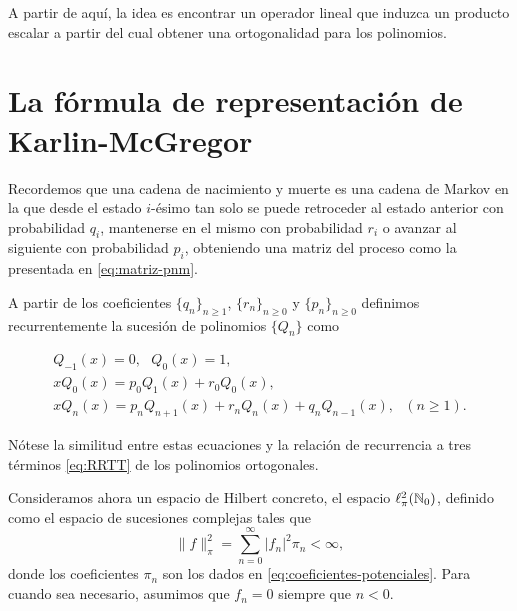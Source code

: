     A partir de aquí, la idea es encontrar un operador lineal que induzca un producto escalar a partir del cual obtener una ortogonalidad para los polinomios.

    \section{La fórmula de representación de Karlin-McGregor}


    Recordemos que una cadena de nacimiento y muerte es una cadena de Markov en la que desde el estado $i$-ésimo tan solo se puede retroceder al estado anterior con probabilidad $q_i$, mantenerse en el mismo con probabilidad $r_i$ o avanzar al siguiente con probabilidad $p_i$, obteniendo una matriz del proceso como la presentada en \eqref{eq:matriz-pnm}.

    A partir de los coeficientes $\{q_n\}_{n\geq 1}$, $\{r_n\}_{n\geq 0}$ y $\{p_n\}_{n\geq 0}$ definimos recurrentemente la sucesión de polinomios $\{Q_n\}$ como

    \begin{equation}
        \label{eq:polinomios-pnm}
        \begin{array}{l}
            Q_{-1}(x) = 0, \ \ \ Q_0(x)=1, \\
            xQ_0(x)=p_0 Q_1(x) + r_0 Q_0(x), \\
            x Q_n(x) = p_n Q_{n+1}(x) + r_n Q_n(x) + q_n Q_{n-1}(x), \ \ \ (n\geq 1).
        \end{array}
    \end{equation}
    
    Nótese la similitud entre estas ecuaciones y la relación de recurrencia a tres términos \eqref{eq:RRTT} de los polinomios ortogonales. 


    Consideramos ahora un espacio de Hilbert concreto, el espacio $\ell^2_\pi(\mathbb{N}_0)$, definido como el espacio de sucesiones complejas tales que 
    $$
    \|f\|_\pi^2=\sum_{n=0}^\infty |f_n|^2\pi_n <\infty,
    $$
    donde los coeficientes $\pi_n$ son los dados en \eqref{eq:coeficientes-potenciales}. Para cuando sea necesario, asumimos que $f_n=0$ siempre que $n<0$.

